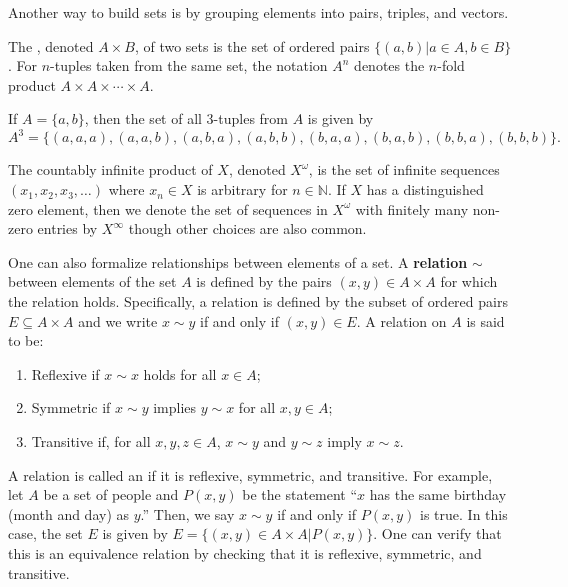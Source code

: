 Another way to build sets is by grouping elements into pairs, triples, and vectors.
\begin{definition}
The , denoted $A\times B$, of two sets is the set of ordered pairs $\{(a,b) | a\in A, b\in B\}$.
For $n$-tuples taken from the same set, the notation $A^n$ denotes the $n$-fold product $A\times A \times \cdots \times A$.
\end{definition}
\begin{example}
If $A  = \{ a,b \}$, then the set of all 3-tuples from $A$ is given by 
\begin{equation*}
A^3 = \{ (a,a,a),(a,a,b),(a,b,a),(a,b,b),(b,a,a),(b,a,b),(b,b,a),(b,b,b) \}.
\end{equation*}
\end{example}
The countably infinite product of $X$, denoted $X^\omega$, is the set of infinite sequences $(x_1,x_2,x_3,\ldots)$ where $x_n \in X$ is arbitrary for $n\in \mathbb{N}$.
If $X$ has a distinguished zero element, then we denote the set of sequences in $X^\omega$ with finitely many non-zero entries by $X^\infty$ though other choices are also common.

One can also formalize relationships between elements of a set.
A \textbf{relation} $\sim$ between elements of the set $A$ is defined by the pairs $(x,y)\in A\times A$ for which the relation holds.
Specifically, a relation is defined by the subset of ordered pairs $E\subseteq A\times A$ and we write $x\sim y$ if and only if $(x,y)\in E$.
A relation on $A$ is said to be:
\begin{enumerate}
\item Reflexive if $x\sim x$ holds for all $x\in A$;
\item Symmetric if $x\sim y$ implies $y\sim x$ for all $x,y\in A$;
\item Transitive if, for all $x,y,z\in A$, $x\sim y$ and $y\sim z$ imply $x\sim z$.

\end{enumerate}

A relation is called an  if it is reflexive, symmetric, and transitive.
For example, let $A$ be a set of people and $P(x,y)$ be the statement ``$x$ has the same birthday (month and day) as $y$.''
Then, we say $x\sim y$ if and only if $P(x,y)$ is true.
In this case, the set $E$ is given by $E = \{ (x,y)\in A\times A | P(x,y) \}$.
One can verify that this is an equivalence relation by checking that it is reflexive, symmetric, and transitive.

